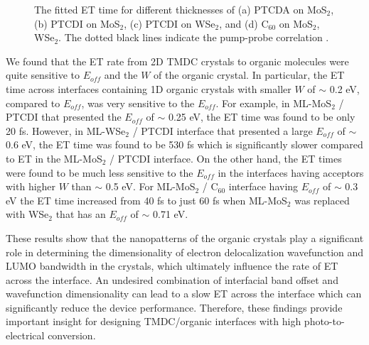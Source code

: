 \documentclass[12pt]{article}
\begin{document}
\begin{figure}[H]
\caption{The fitted ET time for different thicknesses of (a) PTCDA on MoS$_2$, (b) PTCDI on MoS$_2$, (c) PTCDI on WSe$_2$, and (d) C$_{60}$ on MoS$_2$, WSe$_2$. The dotted black lines indicate the pump-probe correlation \cite{rijal2020collective}.}\label{fig:CT rate fitting}
\end{figure}

We found that the ET rate from 2D TMDC crystals to organic molecules were quite sensitive to $E_{off}$ and the $W$ of the organic crystal. In particular, the ET time across interfaces containing 1D organic crystals with smaller $W$ of $\sim$ 0.2 eV, compared to $E_{off}$, was very sensitive to the $E_{off}$. For example, in ML-MoS$_2$ / PTCDI that presented the $E_{off}$ of $\sim$ 0.25 eV, the ET time was found to be only 20 fs. However, in ML-WSe$_2$ / PTCDI interface that presented a large $E_{off}$ of $\sim$ 0.6 eV, the ET time was found to be 530 fs which is significantly slower compared to ET in the ML-MoS$_2$ / PTCDI interface. On the other hand, the ET times were found to be much less sensitive to the $E_{off}$ in the interfaces having acceptors with higher $W$ than $\sim$ 0.5 eV. For ML-MoS$_2$ / C$_{60}$ interface having $E_{off}$ of  $\sim$ 0.3 eV the ET time increased from  40 fs to just 60 fs when ML-MoS$_2$ was replaced with WSe$_2$ that has an  $E_{off}$ of $\sim$ 0.71 eV.
\vspace{7pt}

These results show that the nanopatterns of the organic crystals play a significant role in determining the dimensionality of electron delocalization wavefunction and LUMO bandwidth in the crystals, which ultimately influence the rate of ET across the interface. An undesired combination of interfacial band offset and wavefunction dimensionality can lead to a slow ET across the interface which can significantly reduce the device performance. Therefore, these findings provide important insight for designing TMDC/organic interfaces with high photo-to-electrical conversion.
\end{document}

